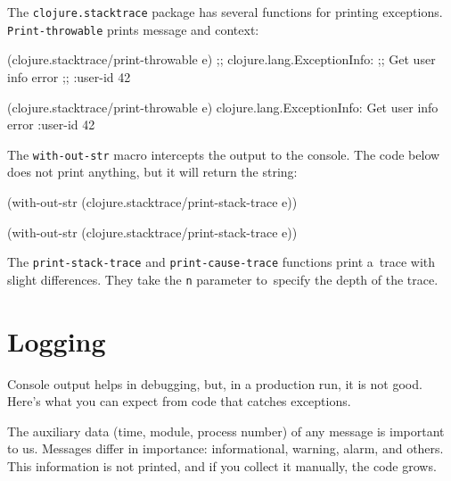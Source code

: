 
The \verb|clojure.stacktrace| package has several functions for printing exceptions. \verb|Print-throwable| prints message and context:

\ifx\DEVICETYPE\MOBILE

\begin{clojure}
(clojure.stacktrace/print-throwable e)
;; clojure.lang.ExceptionInfo:
;; Get user info error
;; {:user-id 42}
\end{clojure}

\else

\begin{clojure}
(clojure.stacktrace/print-throwable e)
clojure.lang.ExceptionInfo: Get user info error
{:user-id 42}
\end{clojure}

\fi

The \verb|with-out-str| macro intercepts the output to the console. The code below does not print anything, but it will return the string:

\ifx\DEVICETYPE\MOBILE

\begin{clojure}
(with-out-str
  (clojure.stacktrace/print-stack-trace
    e))
\end{clojure}

\else

\begin{clojure}
(with-out-str
  (clojure.stacktrace/print-stack-trace e))
\end{clojure}

\fi

The \texttt{print\--stack\--trace} and \texttt{print\--cause\--trace} functions
print a~trace with slight differences. They take the \verb|n| parameter
to~specify the depth of the trace.

\section{Logging}


Console output helps in debugging, but, in a production run, it is not good. Here's what you can expect from code that catches exceptions.

The auxiliary data (time, module, process number) of any message is important to us. Messages differ in importance: informational, warning, alarm, and others. This information is not printed, and if you collect it manually, the code grows.

